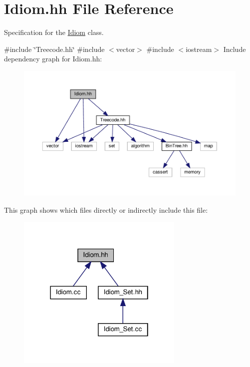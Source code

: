 \hypertarget{Idiom_8hh}{}\section{Idiom.\+hh File Reference}
\label{Idiom_8hh}


Specification for the \hyperlink{classIdiom}{Idiom} class.  


{\ttfamily \#include \char`\"{}Treecode.\+hh\char`\"{}}\newline
{\ttfamily \#include $<$vector$>$}\newline
{\ttfamily \#include $<$iostream$>$}\newline
Include dependency graph for Idiom.\+hh\+:
\nopagebreak
\begin{figure}[H]
\begin{center}
\leavevmode
\includegraphics[width=350pt]{Idiom_8hh__incl}
\end{center}
\end{figure}
This graph shows which files directly or indirectly include this file\+:
\nopagebreak
\begin{figure}[H]
\begin{center}
\leavevmode
\includegraphics[width=226pt]{Idiom_8hh__dep__incl}
\end{center}
\end{figure}
